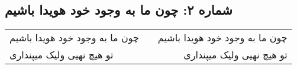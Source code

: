 \begin{center}
\section*{شماره ۲: چون ما به وجود خود هویدا باشیم}
\label{sec:002}
\begin{longtable}{l p{0.5cm} r}
چون ما به وجود خود هویدا باشیم
&&
چون ما به وجود خود هویدا باشیم
\\
تو هیچ نهیی ولیک میپنداری
&&
تو هیچ نهیی ولیک میپنداری
\\
\end{longtable}
\end{center}
